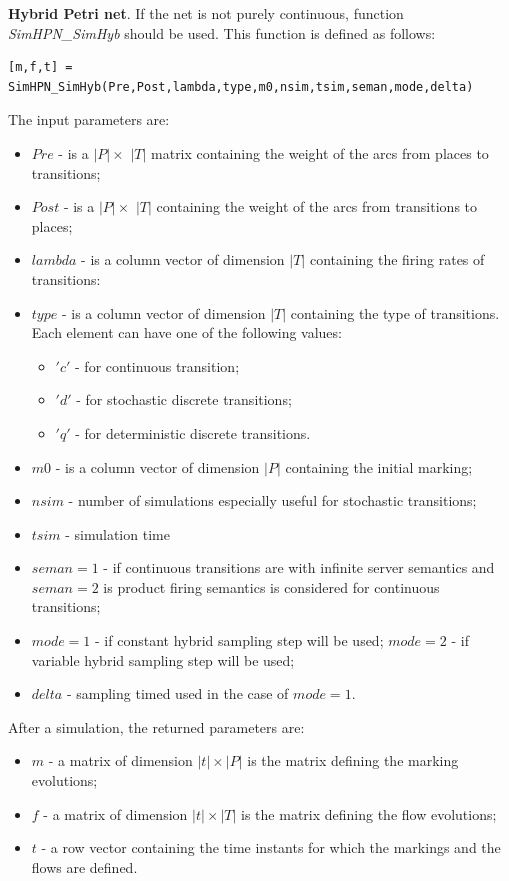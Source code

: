 \textbf{Hybrid Petri net}. If the net is not purely continuous, function \emph{SimHPN\_SimHyb} 
should be used. This function is defined as follows:

\begin{verbatim}
[m,f,t] = SimHPN_SimHyb(Pre,Post,lambda,type,m0,nsim,tsim,seman,mode,delta)
\end{verbatim}

The input parameters are:

\begin{itemize}
\item $Pre$ - is a $|P| \times$ $|T|$ matrix containing the weight of the arcs from places to transitions;
\item $Post$ - is a $|P| \times$ $|T|$   containing the weight of the arcs from transitions to places;
\item $lambda$ - is a column vector of dimension $|T|$ containing the firing rates of transitions:
\item $type$ - is a column vector of dimension $|T|$ containing the type of transitions. Each element can have one of the following values:
\begin{itemize}
\item $'c'$ - for continuous transition;
\item $'d'$ - for stochastic discrete transitions;
\item $'q'$ -  for deterministic  discrete transitions.
\end{itemize}
\item $m0$ - is a column vector of dimension $|P|$ containing the initial marking;
\item $nsim$ - number of simulations especially useful for stochastic transitions;
\item $tsim$ - simulation time
\item $seman = 1$ - if continuous transitions are with infinite server semantics and $seman = 2$ is product firing semantics is considered for continuous transitions;
\item $mode = 1$ - if constant hybrid sampling step will be used;  $mode = 2$ - if variable hybrid sampling step will be used;  
\item $delta$ - sampling timed used in the case of $mode = 1$.
\end{itemize}
 
 After a simulation, the returned parameters are:

\begin{itemize} 
\item $m$ - a matrix of dimension $|t| \times |P|$ is the matrix defining the marking evolutions;
\item $f$ - a matrix of dimension $|t| \times |T|$ is the matrix defining the flow evolutions;
\item $t$ - a row vector containing the time instants for which the markings and the flows are defined.
\end{itemize}

\newpage

